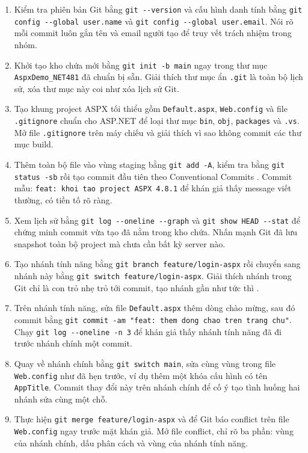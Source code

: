 \begin{enumerate}
\item Kiểm tra phiên bản Git bằng \verb|git --version| và cấu hình danh tính bằng \verb|git config --global user.name| và \verb|git config --global user.email|.
Nói rõ mỗi commit luôn gắn tên và email người tạo để truy vết trách nhiệm trong nhóm.
\item Khởi tạo kho chứa mới bằng \verb|git init -b main| ngay trong thư mục \verb|AspxDemo_NET481| đã chuẩn bị sẵn.
Giải thích thư mục ẩn \verb|.git| là toàn bộ lịch sử, xóa thư mục này coi như xóa lịch sử Git.
\item Tạo khung project ASPX tối thiểu gồm \verb|Default.aspx|, \verb|Web.config| và file \verb|.gitignore| chuẩn cho ASP.NET để loại thư mục \verb|bin|, \verb|obj|, \verb|packages| và \verb|.vs|.
Mở file \verb|.gitignore| trên máy chiếu và giải thích vì sao không commit các thư mục build.
\item Thêm toàn bộ file vào vùng staging bằng \verb|git add -A|, kiểm tra bằng \verb|git status -sb| rồi tạo commit đầu tiên theo Conventional Commits \cite{convcommits}.
Commit mẫu: \verb|feat: khoi tao project ASPX 4.8.1| để khán giả thấy message viết thường, có tiền tố rõ ràng.
\item Xem lịch sử bằng \verb|git log --oneline --graph| và \verb|git show HEAD --stat| để chứng minh commit vừa tạo đã nằm trong kho chứa.
Nhấn mạnh Git đã lưu snapshot toàn bộ project mà chưa cần bất kỳ server nào.
\item Tạo nhánh tính năng bằng \verb|git branch feature/login-aspx| rồi chuyển sang nhánh này bằng \verb|git switch feature/login-aspx|.
Giải thích nhánh trong Git chỉ là con trỏ nhẹ trỏ tới commit, tạo nhánh gần như tức thì \cite{progit,gitflow}.
\item Trên nhánh tính năng, sửa file \verb|Default.aspx| thêm dòng chào mừng, sau đó commit bằng \verb|git commit -am "feat: them dong chao tren trang chu"|.
Chạy \verb|git log --oneline -n 3| để khán giả thấy nhánh tính năng đã đi trước nhánh chính một commit.
\item Quay về nhánh chính bằng \verb|git switch main|, sửa cùng vùng trong file \verb|Web.config| như đã hẹn trước, ví dụ thêm một khóa cấu hình có tên \verb|AppTitle|.
Commit thay đổi này trên nhánh chính để cố ý tạo tình huống hai nhánh sửa cùng một chỗ.
\item Thực hiện \verb|git merge feature/login-aspx| và để Git báo conflict trên file \verb|Web.config| ngay trước mặt khán giả.
Mở file conflict, chỉ rõ ba phần: vùng của nhánh chính, dấu phân cách và vùng của nhánh tính năng.

\end{enumerate}
